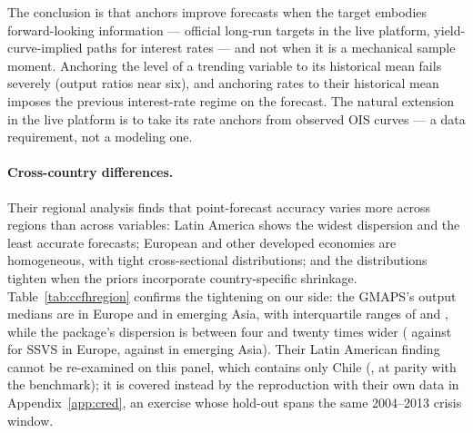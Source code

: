 The conclusion is that anchors improve forecasts when the target embodies
forward-looking information --- official long-run targets in the live platform,
yield-curve-implied paths for interest rates --- and not when it is a mechanical sample
moment. Anchoring the level of a trending variable to its historical mean fails severely
(output ratios near six), and anchoring rates to their historical mean imposes the
previous interest-rate regime on the forecast. The natural extension in the live platform
is to take its rate anchors from observed OIS curves --- a data requirement, not a
modeling one.

\begin{table}[t]
\centering
\caption{Cross-country differences, following the regional analysis of
\citet{CrespoFeldkircherHuber2016}: median $\{$interquartile range$\}$ of country-level
relative RMSFE against the AR(5), output, one quarter ahead. Latin America contains only
Chile on this panel.}
\label{tab:ccfhregion}
\footnotesize\setlength{\tabcolsep}{4pt}
\begin{center}

\end{center}
\end{table}

\paragraph{Cross-country differences.} Their regional analysis finds that point-forecast
accuracy varies more across regions than across variables: Latin America shows the widest
dispersion and the least accurate forecasts; European and other developed economies are
homogeneous, with tight cross-sectional distributions; and the distributions tighten when
the priors incorporate country-specific shrinkage. Table~\ref{tab:ccfhregion} confirms
the tightening on our side: the GMAPS's output medians are \CmRegEuYMed{} in Europe and
\CmRegAsiaYMed{} in emerging Asia, with interquartile ranges of \CmRegEuYIqr{} and
\CmRegAsiaYIqr{}, while the package's dispersion is between four and twenty times wider
(\CmRegSsvsEuYIqr{} against \CmRegEuYIqr{} for SSVS in Europe, \CmRegSsvsAsiaYIqr{}
against \CmRegAsiaYIqr{} in emerging Asia). Their Latin American finding cannot be
re-examined on this panel, which contains only Chile (\CmRegClY{}, at parity with the
benchmark); it is covered instead by the reproduction with their own data in
Appendix~\ref{app:cred}, an exercise whose hold-out spans the same 2004--2013 crisis
window.

